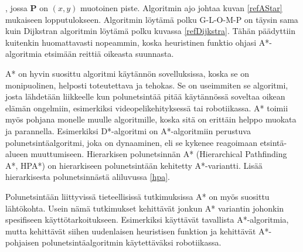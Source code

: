 , jossa \textbf{P} on $(x,y)$ muotoinen piste. Algoritmin ajo johtaa kuvan 
\ref{refAStar} mukaiseen lopputulokseen. Algoritmin löytämä polku G-L-O-M-P on 
täysin sama kuin Dijkstran algoritmin löytämä polku kuvassa 
\ref{refDijkstra}. Tähän päädyttiin kuitenkin huomattavasti nopeammin, koska 
heuristinen funktio ohjasi A*-algoritmia etsimään reittiä oikeasta suunnasta. 
\par
	A* on hyvin suosittu algoritmi käytännön sovelluksissa, koska se on 
monipuolinen, helposti toteutettava ja tehokas. Se on useimmiten se algoritmi, 
josta lähdetään liikkeelle kun polunetsintää pitää käytännössä soveltaa 
oikean elämän ongelmiin, esimerkiksi videopelikehityksessä tai 
robotiikassa.\cite{ProcediaAStar} A* toimii myös pohjana monelle muulle 
algoritmille, koska sitä on erittäin helppo muokata ja 
parannella.\cite{ProcediaAStar} Esimerkiksi D*-algoritmi on A*-algoritmiin 
perustuva polunetsintäalgoritmi, joka on dynaaminen, eli se kykenee 
reagoimaan etsintä-alueen muuttumiseen.\cite{applSciLawande} Hierarkisen 
polunetsinnän A* (Hierarchical Pathfinding A*, HPA*) on hierarkiseen 
polunetsintään kehitetty A*-variantti. Lisää hierarkisesta polunetsinnästä 
aliluvussa \ref{hpa}.\cite{applSciLawande} \par
	Polunetsintään liittyvissä tieteellisissä tutkimuksissa A* on myös 
suosittu lähtökohta. Usein nämä tutkimukset kehittävät jonkun A* variantin 
johonkin spesifiseen käyttötarkoitukseen.\cite{ProcediaAStar} Esimerkiksi 
\textcite{MathewAndMalathy} käyttävät tavallista A*-algoritmia, mutta 
kehittävät siihen uudenlaisen heuristisen funktion ja 
\textcite{DelaunayVoronoiAStar} kehittävät A*-pohjaisen polunetsintäalgoritmin 
käytettäväksi robotiikassa.

